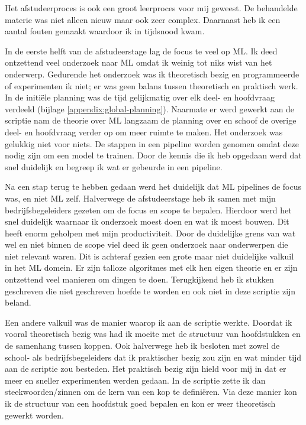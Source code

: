 Het afstudeerproces is ook een groot leerproces voor mij geweest. De behandelde materie was niet alleen nieuw maar ook zeer complex. Daarnaast heb ik een aantal fouten gemaakt waardoor ik in tijdsnood kwam.

In de eerste helft van de afstudeerstage lag de focus te veel op ML. Ik deed ontzettend veel onderzoek naar ML omdat ik weinig tot niks wist van het onderwerp. Gedurende het onderzoek was ik theoretisch bezig en programmeerde of experimenten ik niet; er was geen balans tussen theoretisch en praktisch werk. In de initiële planning was de tijd gelijkmatig over elk deel- en hoofdvraag verdeeld (bijlage \ref{appendix:global-planning}). Naarmate er werd gewerkt aan de scriptie nam de theorie over ML langzaam de planning over en schoof de overige deel- en hoofdvraag verder op om meer ruimte te maken. Het onderzoek was gelukkig niet voor niets. De stappen in een pipeline worden genomen omdat deze nodig zijn om een model te trainen. Door de kennis die ik heb opgedaan werd dat snel duidelijk en begreep ik wat er gebeurde in een pipeline.

Na een stap terug te hebben gedaan werd het duidelijk dat ML pipelines de focus was, en niet ML zelf. Halverwege de afstudeerstage heb ik samen met mijn bedrijfsbegeleiders gezeten om de focus en scope te bepalen. Hierdoor werd het snel duidelijk waarnaar ik onderzoek moest doen en wat ik moest bouwen. Dit heeft enorm geholpen met mijn productiviteit. Door de duidelijke grens van wat wel en niet binnen de scope viel deed ik geen onderzoek naar onderwerpen die niet relevant waren. Dit is achteraf gezien een grote maar niet duidelijke valkuil in het ML domein. Er zijn talloze algoritmes met elk hen eigen theorie en er zijn ontzettend veel manieren om dingen te doen. Terugkijkend heb ik stukken geschreven die niet geschreven hoefde te worden en ook niet in deze scriptie zijn beland.

Een andere valkuil was de manier waarop ik aan de scriptie werkte. Doordat ik vooral theoretisch bezig was had ik moeite met de structuur van hoofdstukken en de samenhang tussen koppen. Ook halverwege heb ik besloten met zowel de school- als bedrijfsbegeleiders dat ik praktischer bezig zou zijn en wat minder tijd aan de scriptie zou besteden. Het praktisch bezig zijn hield voor mij in dat er meer en sneller experimenten werden gedaan. In de scriptie zette ik dan steekwoorden/zinnen om de kern van een kop te definiëren. Via deze manier kon ik de structuur van een hoofdstuk goed bepalen en kon er weer theoretisch gewerkt worden.

